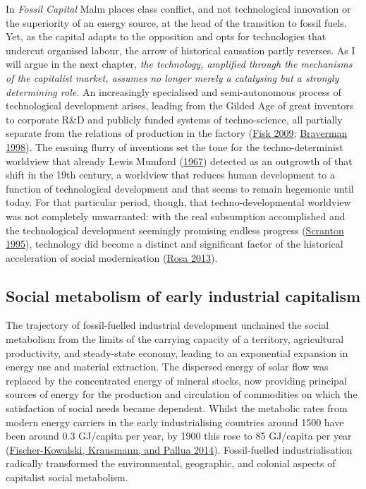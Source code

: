 \documentclass[a4paper, nobind]{templates/ociamthesis}
\begin{document}
In \emph{Fossil Capital} Malm places class conflict, and not technological innovation or the superiority of an energy source, at the head of the transition to fossil fuels. Yet, as the capital adapts to the opposition and opts for technologies that undercut organised labour, the arrow of historical causation partly reverses. As I will argue in the next chapter, \emph{the technology, amplified through the mechanisms of the capitalist market, assumes no longer merely a catalysing but a strongly determining role.} An increasingly specialised and semi-autonomous process of technological development arises, leading from the Gilded Age of great inventors to corporate R\&D and publicly funded systems of techno-science, all partially separate from the relations of production in the factory (\protect\hyperlink{ref-fisk_working_2009}{Fisk 2009}; \protect\hyperlink{ref-braverman_labor_1998}{Braverman 1998}). The ensuing flurry of inventions set the tone for the techno-determinist worldview that already Lewis Mumford (\protect\hyperlink{ref-mumford_myth_1967}{1967}) detected as an outgrowth of that shift in the 19th century, a worldview that reduces human development to a function of technological development and that seems to remain hegemonic until today. For that particular period, though, that techno-developmental worldview was not completely unwarranted: with the real subsumption accomplished and the technological development seemingly promising endless progress (\protect\hyperlink{ref-scranton_determinism_1995}{Scranton 1995}), technology did become a distinct and significant factor of the historical acceleration of social modernisation (\protect\hyperlink{ref-rosa_social_2013}{Rosa 2013}).

\hypertarget{social-metabolism-of-early-industrial-capitalism}{%
\subsection{Social metabolism of early industrial capitalism}\label{social-metabolism-of-early-industrial-capitalism}}

The trajectory of fossil-fuelled industrial development unchained the social metabolism from the limits of the carrying capacity of a territory, agricultural productivity, and steady-state economy, leading to an exponential expansion in energy use and material extraction. The dispersed energy of solar flow was replaced by the concentrated energy of mineral stocks, now providing principal sources of energy for the production and circulation of commodities on which the satisfaction of social needs became dependent. Whilst the metabolic rates from modern energy carriers in the early industrialising countries around 1500 have been around 0.3 GJ/capita per year, by 1900 this rose to 85 GJ/capita per year (\protect\hyperlink{ref-fischer-kowalski_sociometabolic_2014}{Fischer-Kowalski, Krausmann, and Pallua 2014}). Fossil-fuelled industrialisation radically transformed the environmental, geographic, and colonial aspects of capitalist social metabolism.
\end{document}
